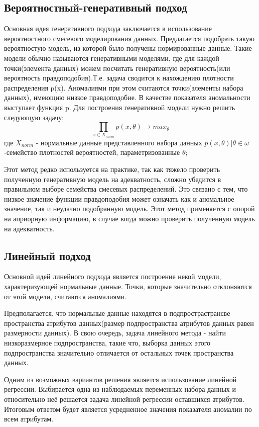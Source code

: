 \subsection{Вероятностный-генеративный подход}
Основная идея генеративного подхода заключается в использование вероятностного смесевого моделирования данных. Предлагается подобрать такую вероятностую модель, из которой было получены нормированные данные. Такие модели обычно называются генеративными моделями, где для каждой точки(элемента данных) можем посчитать генеративную вероятность(или вероятность правдоподобия).Т.е. задача  сводится к нахождению плотности распределения p(x). Аномалиями при этом  считаются точки(элементы набора данных), имеющию низкое правдоподобие. В качестве показателя аномальности выступает функция p.
Для построения генеративной модели нужно решить следующую задачу:
	\begin{equation}
	\prod \limits_{x \in X_{norm}} p(x,\theta)  \rightarrow max_\theta
		\end{equation}
		где $ X_{norm}$ - нормальные данные представленного набора данных ${p(x,\theta)|\theta \in \omega}$ -семейство плотностей вероятностей, параметризованные $\theta$;
		
Этот метод редко используется на практике, так как тяжело проверить полученную генеративную модель на адекватность, сложно  убедится в правильном выборе семейства смесевых распределений. Это связано с тем, что низкое значение функции правдоподобия может означать как и аномальное значение, так и неудачно подобранную модель. Этот метод применяется с опорой на априорную информацию, в случае когда можно проверить полученную модель на адекватность.
\subsection{Линейный подход}
Основной идей линейного подхода является построение некой  модели, характеризующей нормальные данные. Точки, которые значительно отклоняются от этой модели, считаются аномалиями.

Предполагается, что нормальные данные  находятся в подпрострастрансве пространства атрибутов данных(размер подпространства атрибутов данных равен размерности данных). В свою очередь, задача линейного метода - найти низкоразмерное подпространства, такие что, выборка данных этого подпространства значительно отличается от остальных точек пространства данных.

Одним из возможных вариантов решения является использование линейной регрессии. Выбирается одна из наблюдаемых переменных  набора данных и относительно неё решается задача линейной регрессии оставшихся атрибутов. Итоговым ответом будет является усредненное значения показателя аномалии по всем атрибутам. 

